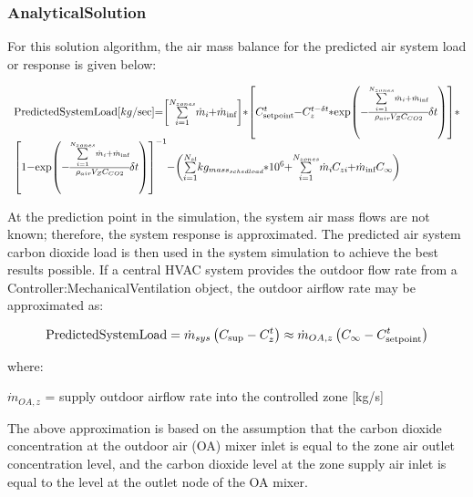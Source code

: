 \subsubsection{AnalyticalSolution}\label{analyticalsolution}

For this solution algorithm, the air mass balance for the predicted air system load or response is given below:

\begin{equation}
\medmuskip=0mu
\thinmuskip=0mu
\thickmuskip=0mu
\nulldelimiterspace=0pt
\scriptspace=0pt
\begin{array}{l}{\rm{PredictedSystemLoad}}\;[kg/\sec ] = \left[ {\sum\limits_{i = 1}^{{N_{zones}}} {{{\dot m}_i}} \; + {{\dot m}_{\inf }}} \right]*\;\left[ {C_{{\rm{setpoint}}}^t - C_z^{t - \delta t}*\exp \left( { - \frac{{\sum\limits_{i = 1}^{{N_{zones}}} {{{\dot m}_i}}  + {{\dot m}_{\inf }}}}{{{\rho_{air}}{V_Z}{C_{CO2}}}}\delta t} \right)} \right]*\\\;\;\;{\left[ {1 - \exp \left( { - \frac{{\sum\limits_{i = 1}^{{N_{zones}}} {{{\dot m}_i}} \; + {{\dot m}_{\inf }}}}{{{\rho_{air}}{V_Z}{C_{CO2}}}}\delta t} \right)} \right]^{ - 1}} - \;\left( {\sum\limits_{i = 1}^{{N_{sl}}} {k{g_{mas{s_{sched\;load}}}}*{{10}^6}}  + \sum\limits_{i = 1}^{{N_{zones}}} {{{\dot m}_i}} {C_{zi}}\; + {{\dot m}_{\inf }}{C_\infty }} \right)\end{array}
\end{equation}

At the prediction point in the simulation, the system air mass flows are not known; therefore, the system response is approximated. The predicted air system carbon dioxide load is then used in the system simulation to achieve the best results possible. If a central HVAC system provides the outdoor flow rate from a Controller:MechanicalVentilation object, the outdoor airflow rate may be approximated as:

\begin{equation}
{\rm{PredictedSystemLoad}} = {\dot m_{sys}}\left( {{C_{\sup }} - C_z^t} \right) \approx {\dot m_{OA,z}}\left( {{C_\infty } - C_{{\rm{setpoint}}}^t} \right)
\end{equation}

where:

\({\dot m_{OA,z}}\) = supply outdoor airflow rate into the controlled zone {[}kg/s{]}

The above approximation is based on the assumption that the carbon dioxide concentration at the outdoor air (OA) mixer inlet is equal to the zone air outlet concentration level, and the carbon dioxide level at the zone supply air inlet is equal to the level at the outlet node of the OA mixer.

